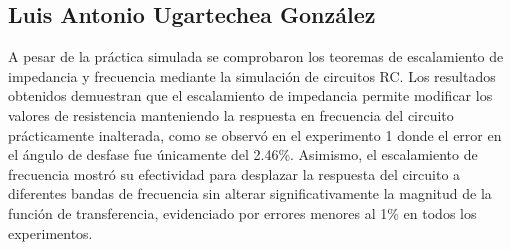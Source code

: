 \documentclass[12pt, letterpaper]{article}
\begin{document}
\subsection*{Luis Antonio Ugartechea González}

A pesar de la práctica simulada se comprobaron los teoremas de escalamiento de impedancia y frecuencia mediante la simulación de circuitos RC. Los resultados obtenidos demuestran que el escalamiento de impedancia permite modificar los valores de resistencia manteniendo la respuesta en frecuencia del circuito prácticamente inalterada, como se observó en el experimento 1 donde el error en el ángulo de desfase fue únicamente del 2.46\%. Asimismo, el escalamiento de frecuencia mostró su efectividad para desplazar la respuesta del circuito a diferentes bandas de frecuencia sin alterar significativamente la magnitud de la función de transferencia, evidenciado por errores menores al 1\% en todos los experimentos.

\end{document}
